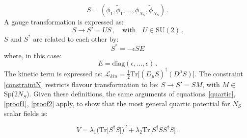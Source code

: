 \begin{equation}
S = (\phi_1, \tilde{\phi}_1, \dots, \phi_{N_S}, \tilde{\phi}_{N_S}) \, .
\end{equation}
%
A gauge transformation is expressed as:
\begin{equation}
S \to S'=US \, , \quad \mathrm{with}  \quad U \in \mathrm{SU(2)} \, .
\end{equation}
%
$S$ and $S^*$ are related to each other by: 
\begin{equation}
S^* = - \epsilon S E
\label{constraintN}
\end{equation}
%
where, in this case:
\begin{equation}
E = \mathrm{diag}(\epsilon, \dots, \epsilon) \, .
\end{equation}
%
The kinetic term is expressed as: $\mathcal{L}_{kin} = \frac{1}{2} \mathrm{Tr} \bigl[ (D_{\mu}S)^{\dagger} (D^{\mu}S) \bigr]$.
The constraint \ref{constraintN} restricts flavour transformation to be: $S \to S' = SM$, with $M \in$ Sp(2$N_S$).
Given these definitions, the same arguments of equations~\ref{quartic}, \ref{proof1}, \ref{proof2} apply, to show that the most general quartic potential for $N_S$ scalar fields is:

\begin{equation}
V = \lambda_1 \bigl( \mathrm{Tr} \bigl[ S^{\dagger} S \bigr] \bigr)^2 + \lambda_2 \mathrm{Tr} \bigl[ S^{\dagger} S S^{\dagger} S\bigr] \, .
\end{equation}




